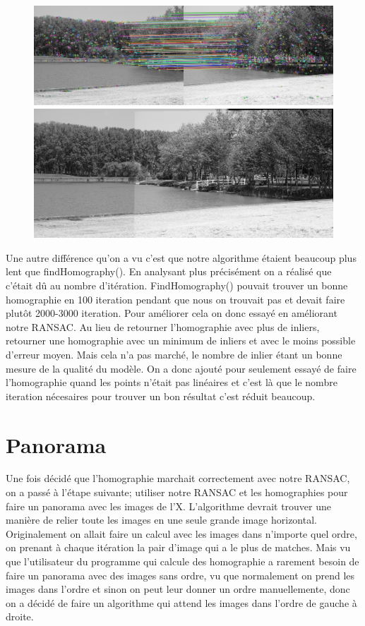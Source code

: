 \documentclass[11pt]{article}
\begin{document}
\begin{figure}[H]
\centering
\includegraphics[width=.8\textwidth]{../resources/matchers/akaze.jpg}
\includegraphics[width=.8\textwidth]{../resources/matchers/akaze_pano.jpg}
\end{figure}

Une autre différence qu’on a vu c’est que notre algorithme étaient beaucoup plus lent que findHomography(). En analysant plus précisément on a réalisé que c’était dû au nombre d'itération. FindHomography() pouvait trouver un bonne homographie en 100 iteration pendant que nous on trouvait pas et devait faire plutôt 2000-3000 iteration. Pour améliorer cela on donc essayé en améliorant notre RANSAC. Au lieu de retourner l'homographie avec plus de inliers, retourner une homographie avec un minimum de inliers et avec le moins possible d'erreur moyen. Mais cela n’a pas marché, le nombre de inlier étant un bonne mesure de la qualité du modèle. On a donc ajouté pour seulement essayé de faire l’homographie quand les points n’était pas linéaires et c’est là que le nombre iteration nécesaires pour trouver un bon résultat c'est réduit beaucoup.

\section{Panorama}

Une fois décidé que l’homographie marchait correctement avec notre RANSAC, on a passé à l’étape suivante; utiliser notre RANSAC et les homographies pour faire un panorama avec les images de l’X. L’algorithme devrait trouver une manière de relier toute les images en une seule grande image horizontal. \\
Originalement on allait faire un calcul avec les images dans n’importe quel ordre, on prenant à chaque itération la pair d’image qui a le plus de matches. Mais vu que l’utilisateur du programme qui calcule des homographie a rarement besoin de faire un panorama avec des images sans ordre, vu que normalement on prend les images dans l’ordre et sinon on peut leur donner un ordre manuellemente, donc on a décidé de faire un algorithme qui attend les images dans l’ordre de gauche à droite.  
\end{document}
